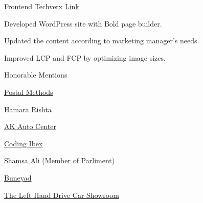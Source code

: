 \begin{cventries}
\cventry
    {Frontend} %
    {Techverx} %
    {{\href{https://www.techverx.com/}{Link}}} %
    {} %
    {
      \begin{cvitems} %
        \item {Developed WordPress site with Bold page builder.}
        \item {Updated the content according to marketing manager's needs.}
        \item {Improved LCP and FCP by optimizing image sizes.}
      \end{cvitems}
    }

\cventry
    {} %
    {Honorable Mentions} %
    {} %
    {} %
    {
      \begin{cvitems} %
        \item {}
        \item {\href{https://www.postalmethods.com/}{Postal Methods}}
        \item {\href{https://www.hamararishta.pk/}{Hamara Rishta}}
        \item {\href{https://www.akautocenter.ae/}{AK Auto Center}}
        \item {\href{https://www.codingibex.com/}{Coding Ibex}}
        \item {\href{https://www.shamsaali.com/}{Shamsa Ali (Member of Parliment)}}
        \item {\href{https://www.buneyad.com/}{Buneyad}}
        \item {\href{https://www.lhdcarshowroom.co.uk/}{The Left Hand Drive Car Showroom}}
      \end{cvitems}
    }

\end{cventries}

